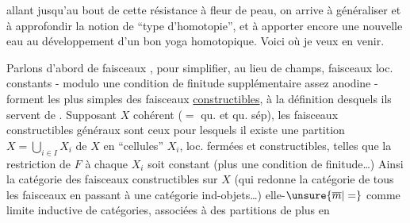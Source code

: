 allant jusqu'au bout\unsure{,} de cette résistance à fleur de peau, on arrive à généraliser et à approfondir la notion de ``type d'homotopie'', et à apporter encore une nouvelle eau au développement d'un bon yoga homotopique. Voici où je veux en venir.

Parlons d'abord de faisceaux , pour simplifier, au lieu de champs,   faisceaux loc. constants - modulo une condition de finitude supplémentaire assez anodine - forment les plus simples des faisceaux \uline{constructibles}, à la définition desquels ils servent de . Supposant $X$ cohérent ($=$ qu.  et qu. sép), les faisceaux constructibles généraux sont ceux pour lesquels il existe une partition  $X=\bigcup\limits_{i\in I}X_i$ de $X$ en ``cellules''  $X_i$, loc. fermées et constructibles, telles que  la restriction de $F$ à chaque $X_i$ soit  constant  (plus une condition de finitude\ldots) Ainsi la catégorie des faisceaux constructibles sur $X$  (qui redonne la catégorie de tous les faisceaux en passant à une catégorie  ind-objets\ldots)  elle-$\unsure{\overline m|=}$ comme limite inductive de catégories, associées à des partitions de plus en
